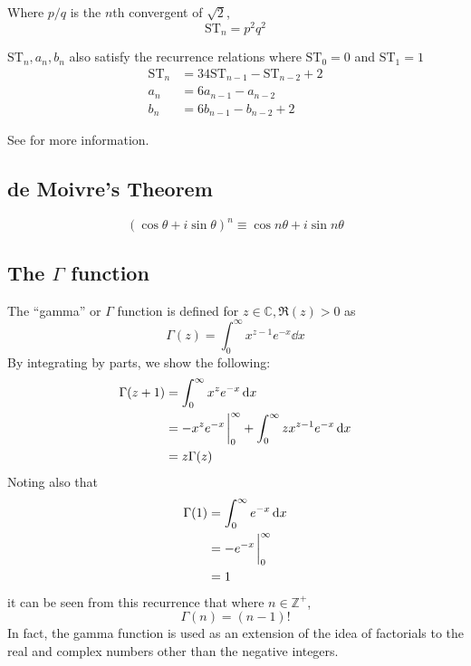 \documentclass[fleqn,a4paper,11pt]{article}
\newcommand{\setstyle}{\mathbb}
\newcommand{\Integers}{\setstyle Z}
\newcommand{\Complex}{\setstyle C}
\begin{document}

    Where \(p / q\) is the \(n\)th convergent of \(\sqrt 2\),
    \begin{equation}
    \mathrm{ST}_n = p^2 q^2
    \end{equation}

    \(\mathrm{ST}_n, a_n, b_n\) also satisfy the recurrence relations where
    \(\mathrm{ST}_0 = 0\) and \(\mathrm{ST}_1 = 1\)
    \begin{align}
    \mathrm{ST}_n &= 34\mathrm{ST}_{n - 1} - \mathrm{ST}_{n - 2} + 2\\
    a_n &= 6a_{n - 1} - a_{n - 2} \\
    b_n &= 6b_{n - 1} - b_{n - 2} + 2
    \end{align}

    See \cite{WikiSTNumbers,WolframSTNumbers} for more information.

    \subsection{de Moivre's Theorem}

    \begin{equation}
    (\cos \theta + i \sin \theta)^n \equiv \cos n\theta + i \sin n\theta
    \end{equation}

    \subsection[The \(\Gamma\) function]
               {The \boldmath\(\Gamma\) function}

    The ``gamma'' or \(\Gamma\) function is defined for
    \(z \in \Complex, \Re(z) > 0\) as
    \begin{equation}
    \Gamma(z) = \int_0^{\infty} x^{z - 1}e^{-x} \dd{x}
    \end{equation}
    By integrating by parts, we show the following:
    \begin{align*}
    \Gamma(z + 1) &= \int_0^\infty x^{z}e^{-x} \dd{x} \\
                  &= -x^{z} e^{-x}\eval_0^\infty
                     + \int_0^\infty zx^{z - 1}e^{-x} \dd{x} \\
                  &= z\Gamma(z)
    \end{align*}
    Noting also that
    \begin{align*}
    \Gamma(1) &= \int_0^\infty e^{-x} \dd{x} \\
              &= -e^{-x}\eval_0^\infty \\
              &= 1
    \end{align*}
    it can be seen from this recurrence that where \(n \in \Integers^+\),
    \begin{equation}
    \Gamma(n) = (n - 1)!
    \end{equation}
    In fact, the gamma function is used as an extension of the idea of
    factorials to the real and complex numbers other than the negative integers.
\end{document}
